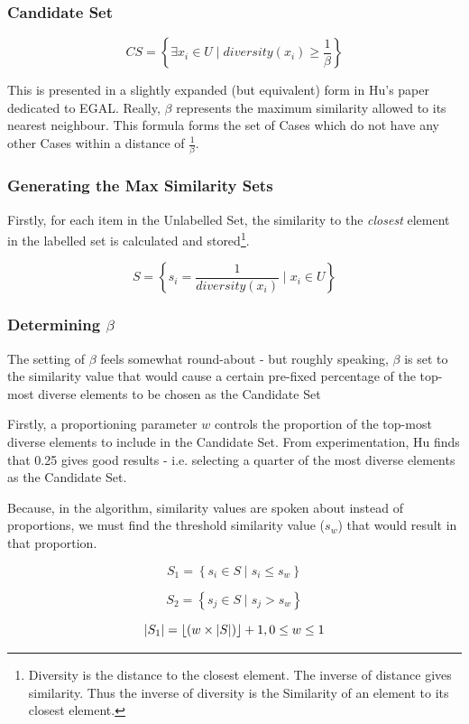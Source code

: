 \documentclass[a4paper,11pt]{report}
\begin{document}
\subsubsection{Candidate Set}
\[
CS=\left\{ \exists x_{i}\in U\mid diversity(x_{i})\geq\frac{1}{\beta}\right\} 
\]

This is presented in a slightly expanded (but equivalent) form in Hu's paper dedicated to EGAL\citep{Hu2010}. Really, $\beta$ represents the maximum similarity allowed to its nearest neighbour. This formula forms the set of Cases which do not have any other Cases within a distance of $\frac{1}{\beta}$.

\subsubsection{Generating the Max Similarity Sets}

Firstly, for each item in the Unlabelled Set, the similarity to the \emph{closest} element in the labelled set is calculated and stored\footnote{Diversity is the distance to the closest element. The inverse of distance gives similarity. Thus the inverse of diversity is the Similarity of an element to its closest element.}.

\[
S=\left\{ s_{i}=\frac{1}{diversity(x_{i})}\mid x_{i}\in U\right\} 
\]

\subsubsection{Determining $\beta$}
The setting of $\beta$ feels somewhat round-about - but roughly speaking, $\beta$ is set to the similarity value that would cause a certain pre-fixed percentage of the top-most diverse elements to be chosen as the Candidate Set

Firstly, a proportioning parameter $w$ controls the proportion of the top-most diverse elements to include in the Candidate Set. From experimentation, Hu finds that 0.25 gives good results - i.e. selecting a quarter of the most diverse elements as the Candidate Set.

Because, in the algorithm, similarity values are spoken about instead of proportions, we must find the threshold similarity value ($s_{w}$) that would result in that proportion.

\[
S_{1}=\left\{ s_{i}\in S\mid s_{i}\leq s_{w}\right\} 
\]

\[
S_{2}=\left\{ s_{j}\in S\mid s_{j}>s_{w}\right\} 
\]

\[
\left|S_{1}\right|=\left\lfloor \left(w\times\left|S\right|\right)\right\rfloor +1,\hphantom{}0\leq w\leq 1
\]
\end{document}
